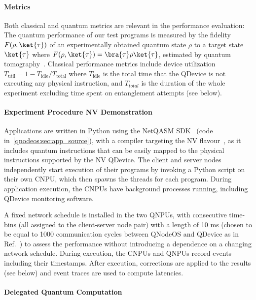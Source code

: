 \paragraph{Metrics}

Both classical and quantum metrics are relevant in the performance evaluation: The quantum performance of our test programs is measured by the fidelity $F(\rho,\ket{\tau})$ of an experimentally obtained quantum state $\rho$ to a target state $\ket{\tau}$ where $F(\rho,\ket{\tau}) = \bra{\tau}\rho\ket{\tau}$, estimated by quantum tomography~\cite{paris_quantum_2004}.
Classical performance metrics include device utilization $T_{\text{util}} = 1 - T_{\text{idle}} / T_{\text{total}}$ where $T_{\text{idle}}$ is the total time that the QDevice is not executing any physical instruction, and $T_{total}$ is the duration of the whole experiment excluding time spent on entanglement attempts (see below).

\paragraph{Experiment Procedure NV Demonstration}

Applications are written in Python using the NetQASM SDK~\cite{dahlberg_2022_netqasm} (code in~\cref{qnodeos:sec:app_source}), with a compiler targeting the NV flavour~\cite{dahlberg_2022_netqasm}, as it includes quantum instructions that can be easily mapped to the physical instructions supported by the NV QDevice.
The client and server nodes independently start execution of their programs by invoking a Python script on their own CNPU, which then spawns the threads for each program.
During application execution, the CNPUs have background processes running, including QDevice monitoring software.

A fixed network schedule is installed in the two QNPUs, with consecutive time-bins (all assigned to the client-server node pair) with a length of 10 ms (chosen to be equal to 1000 communication cycles between QNodeOS and QDevice as in Ref.~\cite{pompili_2022_experimental}) to assess the performance without introducing a dependence on a changing network schedule.
During execution, the CNPUs and QNPUs record events including their timestamps.
After execution, corrections are applied to the results (see below) and event traces are used to compute latencies.

\paragraph{Delegated Quantum Computation}

